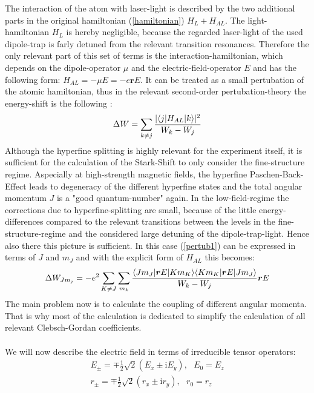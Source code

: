 The interaction of the atom with laser-light is described by the two additional parts in the original hamiltonian (\ref{hamiltonian}) $H_L+H_{AL}$. The light-hamiltonian $H_L$ is hereby negligible, because the regarded laser-light of the used dipole-trap is farly detuned from the relevant transition resonances. Therefore the only relevant part of this set of terms is the interaction-hamiltonian, which depends on the dipole-operator $\mu$ and the electric-field-operator $E$ and has the following form: $H_{AL}=-\mu E=-e\boldsymbol{r} E$. It can be treated as a small pertubation of the atomic hamiltonian, thus in the relevant second-order pertubation-theory the energy-shift is the following \cite{dipole}:
\begin{equation}
\Delta W=\sum_{k\neq j}\frac{|\langle j| H_{AL} | k\rangle|^2}{W_k-W_j}
\label{pertub1}
\end{equation}
Although the hyperfine splitting is highly relevant for the experiment itself, it is sufficient for the calculation of the Stark-Shift to only consider the fine-structure regime. Aspecially at high-strength magnetic fields, the hyperfine Paschen-Back-Effect leads to degeneracy of the different hyperfine states and the total angular momentum $J$ is a "good quantum-number" again. In the low-field-regime the corrections due to hyperfine-splitting are small, because of the little energy-differences compared to the relevant transitions between the levels in the fine-structure-regime and the considered large detuning of the dipole-trap-light. Hence also there this picture is sufficient. In this case (\ref{pertub1}) can be expressed in terms of $J$ and $m_J$ and with the explicit form of $H_{AL}$ this becomes\cite{alpha}:
\begin{equation}
\Delta W_{Jm_j}=-e^2\sum_{K\neq J}\sum_{m_k}\frac{\langle Jm_J| \boldsymbol{r}E | Km_K\rangle\langle Km_K| \boldsymbol{r}E | Jm_J\rangle}{W_k-W_j}\boldsymbol{r}E\label{pertub2}
\end{equation}
The main problem now is to calculate the coupling of different angular momenta. That is why most of the calculation is dedicated to simplify the calculation of all relevant Clebsch-Gordan coefficients.\\\\
We will now describe the electric field in terms of irreducible tensor operators:
\begin{align}
E_{\pm}=\mp\frac{1}{2}\sqrt{2}(E_x\pm \mathrm{i}E_y),\ \ \ E_0=E_z\\
r_{\pm}=\mp\frac{1}{2}\sqrt{2}(r_x\pm \mathrm{i}r_y),\ \ \ r_0=r_z\\
\end{align}
